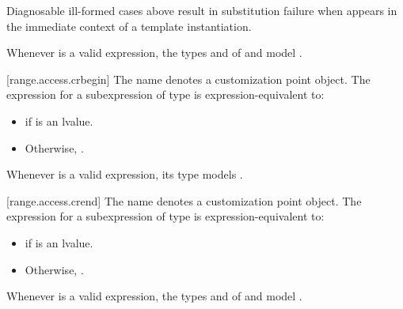 \pnum
\begin{note}
Diagnosable ill-formed cases above
result in substitution failure when 
appears in the immediate context of a template instantiation.
\end{note}

\pnum
\begin{note}
Whenever  is a valid expression,
the types  and  of
 and 
model .
\end{note}

[range.access.crbegin]{}
\pnum
The name  denotes a customization point
object. The expression
 for a subexpression  of type
 is expression-equivalent to:
\begin{itemize}
\item {} if  is
  an lvalue.
\item Otherwise, .
\end{itemize}

\pnum
\begin{note}
Whenever  is a valid expression, its
type models .
\end{note}

[range.access.crend]{}
\pnum
The name  denotes a customization point
object. The expression
 for a subexpression  of type 
is expression-equivalent to:
\begin{itemize}
\item {} if  is an lvalue.

\item Otherwise, .
\end{itemize}

\pnum
\begin{note}
Whenever  is a valid expression,
the types  and  of
 and 
model .
\end{note}

